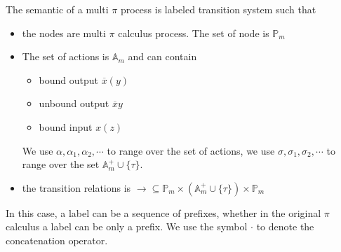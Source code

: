 The semantic of a multi $\pi$ process is labeled transition system such that
\begin{itemize}
  \item 
    the nodes are multi $\pi$ calculus process. The set of node is $\mathbb{P}_{m}$
  \item
    The set of actions is $\mathbb{A}_{m}$ and can contain
    \begin{itemize}
      \item 
	bound output $\overline{x}(y)$
      \item
	unbound output $\overline{x}y$ 
      \item
	bound input $x(z)$
    \end{itemize}
    We use $\alpha, \alpha_{1}, \alpha_{2},\cdots $ to range over the set of actions, we use $\sigma, \sigma_{1}, \sigma_{2}, \cdots $ to range over the set $\mathbb{A}_{m}^{+} \cup \{\tau\}$. 
  \item
    the transition relations is $\rightarrow\subseteq \mathbb{P}_{m}\times (\mathbb{A}_{m}^{+} \cup \{\tau\})\times \mathbb{P}_{m}$
\end{itemize}

In this case, a label can be a sequence of prefixes, whether in the original $\pi$ calculus a label can be only a prefix. We use the symbol $\cdot$ to denote the concatenation operator.

